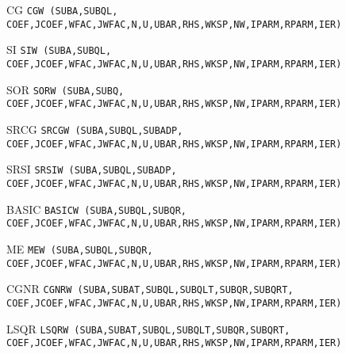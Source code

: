 \bigskip
\begin{list}{}{
            \leftmargin 1.00in \rightmargin 0.25in}
\item[CG \hfill]
{\tt CGW (SUBA,SUBQL,                     \\
 \hspace*{0.75in} COEF,JCOEF,WFAC,JWFAC,N,U,UBAR,RHS,WKSP,NW,IPARM,RPARM,IER) }
 
\item[SI \hfill]
{\tt SIW (SUBA,SUBQL,                     \\
 \hspace*{0.75in} COEF,JCOEF,WFAC,JWFAC,N,U,UBAR,RHS,WKSP,NW,IPARM,RPARM,IER) }
 
\item[SOR \hfill]
{\tt SORW (SUBA,SUBQ,                      \\
 \hspace*{0.75in} COEF,JCOEF,WFAC,JWFAC,N,U,UBAR,RHS,WKSP,NW,IPARM,RPARM,IER) }
 
\item[SRCG \hfill]
{\tt SRCGW (SUBA,SUBQL,SUBADP,              \\
 \hspace*{0.75in} COEF,JCOEF,WFAC,JWFAC,N,U,UBAR,RHS,WKSP,NW,IPARM,RPARM,IER) }
 
\item[SRSI \hfill]
{\tt SRSIW (SUBA,SUBQL,SUBADP,              \\
 \hspace*{0.75in} COEF,JCOEF,WFAC,JWFAC,N,U,UBAR,RHS,WKSP,NW,IPARM,RPARM,IER) }
 
\item[BASIC \hfill]
{\tt BASICW (SUBA,SUBQL,SUBQR,               \\
 \hspace*{0.75in} COEF,JCOEF,WFAC,JWFAC,N,U,UBAR,RHS,WKSP,NW,IPARM,RPARM,IER) }
 
\item[ME \hfill]
{\tt MEW (SUBA,SUBQL,SUBQR,               \\
 \hspace*{0.75in} COEF,JCOEF,WFAC,JWFAC,N,U,UBAR,RHS,WKSP,NW,IPARM,RPARM,IER) }
 
\item[CGNR \hfill]
{\tt CGNRW (SUBA,SUBAT,SUBQL,SUBQLT,SUBQR,SUBQRT, \\
 \hspace*{0.75in} COEF,JCOEF,WFAC,JWFAC,N,U,UBAR,RHS,WKSP,NW,IPARM,RPARM,IER) }
 
\item[LSQR \hfill]
{\tt LSQRW (SUBA,SUBAT,SUBQL,SUBQLT,SUBQR,SUBQRT, \\
 \hspace*{0.75in} COEF,JCOEF,WFAC,JWFAC,N,U,UBAR,RHS,WKSP,NW,IPARM,RPARM,IER) }
 

\end{list}
